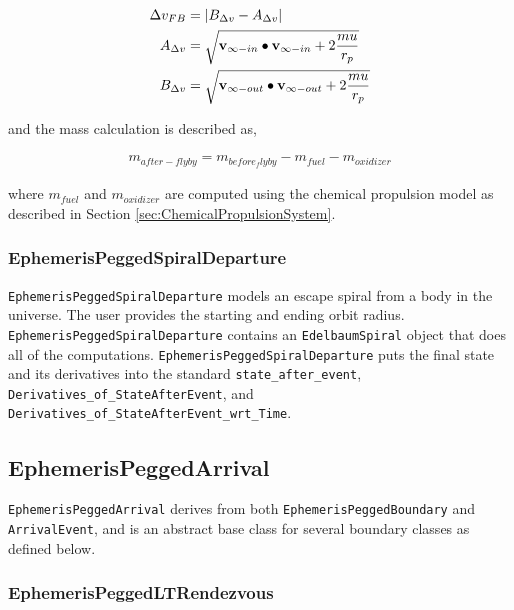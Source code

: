 \begin{align}
	\label{eq:powered_flyby_deltav}
	\Delta v_{FB} &= \lvert B_{\Delta v} - A_{\Delta v}\rvert\\
	A_{\Delta v} &= \sqrt{\mathbf{v}_{\infty-in} \bullet \mathbf{v}_{\infty-in} + 2\frac{mu}{r_p}}\\
	B_{\Delta v} &= \sqrt{\mathbf{v}_{\infty-out} \bullet \mathbf{v}_{\infty-out} + 2\frac{mu}{r_p}}
\end{align}

\noindent and the mass calculation is described as,

\begin{align}
	\label{eq:powered_flyby_mass}
	m_{after-flyby} = m_{before_flyby} - m_{fuel} - m_{oxidizer}
\end{align}

\noindent where $m_{fuel}$ and $m_{oxidizer}$ are computed using the chemical propulsion model as described in Section \ref{sec:ChemicalPropulsionSystem}.

\subsubsection{EphemerisPeggedSpiralDeparture}
\label{subsubsec:EphemerisPeggedSpiralDeparture}

\texttt{EphemerisPeggedSpiralDeparture} models an escape spiral from a body in the universe. The user provides the starting and ending orbit radius. \texttt{EphemerisPeggedSpiralDeparture} contains an \texttt{EdelbaumSpiral} object that does all of the computations. \texttt{EphemerisPeggedSpiralDeparture} puts the final state and its derivatives into the standard \texttt{state\_after\_event}, \texttt{Derivatives\_of\_StateAfterEvent}, and \texttt{Derivatives\_of\_StateAfterEvent\_wrt\_Time}.

\subsection{EphemerisPeggedArrival}
\label{subsec:ephemerispeggedarrival}

\texttt{EphemerisPeggedArrival} derives from both \texttt{EphemerisPeggedBoundary} and \texttt{ArrivalEvent}, and is an abstract base class for several boundary classes as defined below.

\subsubsection{EphemerisPeggedLTRendezvous}
\label{subsubsec:EphemerisPeggedLTRendezvous}

